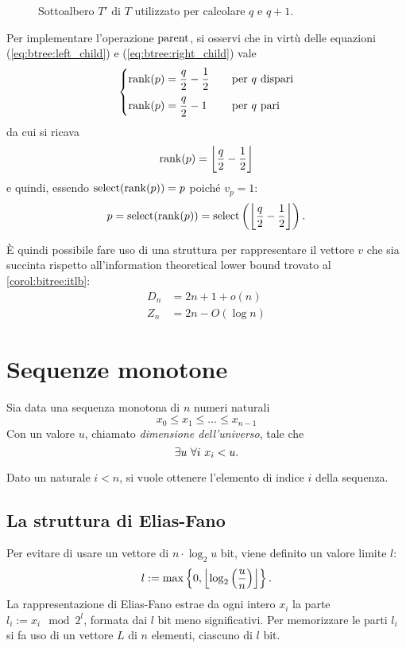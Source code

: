 \begin{figure}
	\centering
	
	\caption{Sottoalbero $T'$ di $T$ utilizzato per calcolare $q$ e $q+1$.}
	\label{fig:btree_rappr_step}
\end{figure}

Per implementare l'operazione $\mathrm{parent}$, si osservi che in virtù delle equazioni (\ref{eq:btree:left_child}) e (\ref{eq:btree:right_child}) vale
\begin{equation*}
	\begin{cases}
		\mathrm{rank}(p)=\dfrac{q}{2}-\dfrac12 & \quad\text{per $q$ dispari} \\[2ex]
		\mathrm{rank}(p)=\dfrac{q}{2}-1        & \quad\text{per $q$ pari}
	\end{cases}
\end{equation*}
da cui si ricava
\begin{equation*}
	\mathrm{rank}(p)=\left\lfloor \frac q2-\frac 12 \right\rfloor
\end{equation*}
e quindi, essendo $\mathrm{select}(\mathrm{rank}(p))=p$ poiché $v_p=1$:
\begin{equation*}
	p=\mathrm{select}(\mathrm{rank}(p))=\mathrm{select}\left(\left\lfloor \frac q2-\frac 12 \right\rfloor\right) \text.
\end{equation*}

È quindi possibile fare uso di una struttura per rappresentare il vettore $v$ che sia succinta rispetto all'information theoretical lower bound trovato al \cref{corol:bitree:itlb}:
\begin{align*}
	D_n & = 2n+1+o(n)    \\
	Z_n & = 2n-O(\log n)
\end{align*}



\section{Sequenze monotone}
Sia data una sequenza monotona di $n$ numeri naturali
\begin{equation*}
	x_0\leq x_1\leq \dots \leq x_{n-1}
\end{equation*}
Con un valore $u$, chiamato \emph{dimensione dell'universo}, tale che
\begin{equation*}
	\exists u ~ \forall i ~ x_i < u \text.
\end{equation*}

Dato un naturale $i<n$, si vuole ottenere l'elemento di indice $i$ della sequenza.


\subsection{La struttura di Elias-Fano}
Per evitare di usare un vettore di $n\cdot\log_2 u$ bit, viene definito un valore limite $l$:
\begin{equation*}
	l := \max\left\{ 0,\left\lfloor \log_2\left(\frac{u}{n}\right) \right\rfloor \right\}\text.
\end{equation*}
La rappresentazione di Elias-Fano estrae da ogni intero $x_i$ la parte $l_i:=x_i\mod 2^l$, formata dai $l$ bit meno significativi. Per memorizzare le parti $l_i$ si fa uso di un vettore $L$ di $n$ elementi, ciascuno di $l$ bit.

